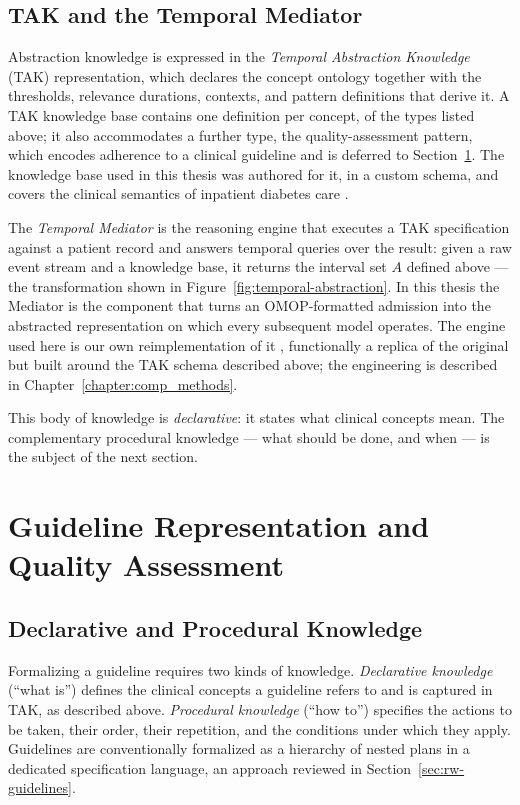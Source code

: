 \subsection{TAK and the Temporal Mediator}

Abstraction knowledge is expressed in the \emph{Temporal Abstraction Knowledge} (TAK) representation, which declares the concept ontology together with the thresholds, relevance durations, contexts, and pattern definitions that derive it. A TAK knowledge base contains one definition per concept, of the types listed above; it also accommodates a further type, the quality-assessment pattern, which encodes adherence to a clinical guideline and is deferred to Section~\ref{sec:prelim-qa}. The knowledge base used in this thesis was authored for it, in a custom schema, and covers the clinical semantics of inpatient diabetes care \citep{mediator-github}.

The \emph{Temporal Mediator} \citep{shahar1997framework} is the reasoning engine that executes a TAK specification against a patient record and answers temporal queries over the result: given a raw event stream and a knowledge base, it returns the interval set $A$ defined above --- the transformation shown in Figure~\ref{fig:temporal-abstraction}. In this thesis the Mediator is the component that turns an OMOP-formatted admission into the abstracted representation on which every subsequent model operates. The engine used here is our own reimplementation of it \citep{mediator-github}, functionally a replica of the original but built around the TAK schema described above; the engineering is described in Chapter~\ref{chapter:comp_methods}.

This body of knowledge is \emph{declarative}: it states what clinical concepts mean. The complementary procedural knowledge --- what should be done, and when --- is the subject of the next section.

\section{Guideline Representation and Quality Assessment}
\label{sec:prelim-qa}

\subsection{Declarative and Procedural Knowledge}

Formalizing a guideline requires two kinds of knowledge. \emph{Declarative knowledge} (``what is'') defines the clinical concepts a guideline refers to and is captured in TAK, as described above. \emph{Procedural knowledge} (``how to'') specifies the actions to be taken, their order, their repetition, and the conditions under which they apply. Guidelines are conventionally formalized as a hierarchy of nested plans in a dedicated specification language, an approach reviewed in Section~\ref{sec:rw-guidelines}.

